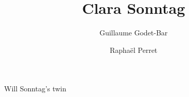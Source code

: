 \documentclass{rpg_non_player_character}
\title{Clara Sonntag}
\begin{document}
\author{Guillaume Godet-Bar \and Rapha\"el Perret}
\maketitle

Will Sonntag's twin
\end{document}
